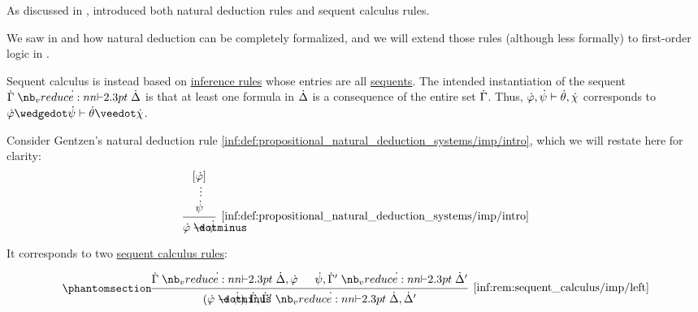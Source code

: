\begin{remark}\label{rem:sequent_calculus}
  As discussed in ,  introduced both natural deduction rules and sequent calculus rules.

  We saw in  and  how natural deduction can be completely formalized, and we will extend those rules (although less formally) to first-order logic in .

  Sequent calculus is instead based on \hyperref[def:inference_rule]{inference rules} whose entries are all \hyperref[def:sequent]{sequents}. The intended instantiation of the sequent  \( \syn\Gamma \synvdash \syn\Delta \) is that at least one formula in \( \dot{\Delta} \) is a consequence of the entire set \( \dot{\Gamma} \). Thus, \( \dot{\varphi}, \dot{\psi} \vdash \dot{\theta}, \dot{\chi} \) corresponds to \( \syn\varphi \synwedge \syn\psi \vdash \syn\theta \synvee \syn\chi \).

  Consider Gentzen's natural deduction rule \ref{inf:def:propositional_natural_deduction_systems/imp/intro}, which we will restate here for clarity:
  \begin{equation*}
    \begin{prooftree}
      \hypo{ [\syn\varphi] }
      \ellipsis {} { \syn\psi }
      \infer1[\ref{inf:def:propositional_natural_deduction_systems/imp/intro}]{ \syn\varphi \synimplies \syn\psi }
    \end{prooftree}
  \end{equation*}

  It corresponds to two \hyperref[def:abstract_sequent_calculus_system]{sequent calculus rules}:
  \begin{paracol}{2}
    \begin{leftcolumn}
      \ParacolAlignmentHack
      \begin{equation*}\taglabel[\ensuremath{ \rightarrow_L }]{inf:rem:sequent_calculus/imp/left}
        \begin{prooftree}
          \hypo{ \syn\Gamma \synvdash \syn\Delta, \syn\varphi }
          \hypo{ \syn\psi, \syn\Gamma' \synvdash \syn\Delta' }
          \infer2[\ref{inf:rem:sequent_calculus/imp/left}]{ (\syn\varphi \synimplies \syn\psi), \syn\Gamma, \syn\Gamma' \synvdash \syn\Delta, \syn\Delta' }
        \end{prooftree}
      \end{equation*}
    \end{leftcolumn}


\end{paracol}
\end{remark}
